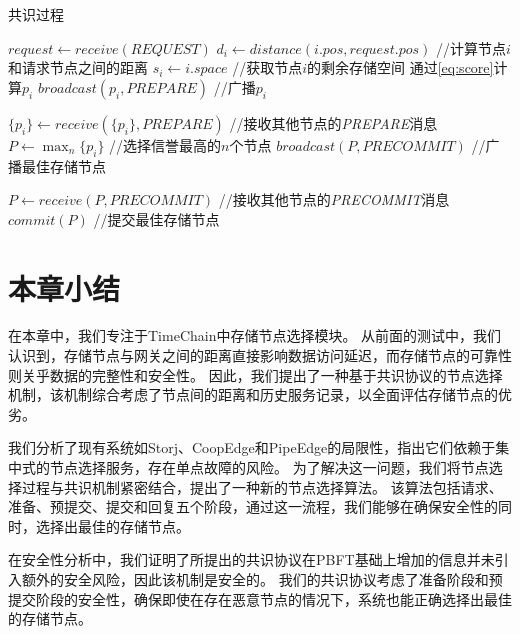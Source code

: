 \begin{algorithm}
	\caption{共识过程}
	\label{algo:consensus}
	\begin{algorithmic}[1]
        \renewcommand{\algorithmicrequire}{ \textbf{准备阶段}}
        \REQUIRE
            \STATE $request \gets \textit{receive}(REQUEST)$
                \STATE $d_i \gets \textit{distance}(i.pos, request.pos)$ //计算节点$i$和请求节点之间的距离
                \STATE $s_i \gets i.space$ //获取节点$i$的剩余存储空间
                \STATE 通过\autoref{eq:score}计算$p_i$
                \STATE $\textit{broadcast}(p_i, \textit{PREPARE})$  //广播$p_i$
            \ENDIF

        \renewcommand{\algorithmicrequire}{ \textbf{预提交阶段}}
        \REQUIRE
            \STATE $\{p_i\} \gets \textit{receive}(\{p_i\}, \textit{PREPARE})$  //接收其他节点的\textit{PREPARE}消息
                \STATE $P \gets \max_n \{p_i\}$ //选择信誉最高的$n$个节点
                \STATE $\textit{broadcast}(P, \textit{PRECOMMIT})$  //广播最佳存储节点
            \ENDIF

        \renewcommand{\algorithmicrequire}{ \textbf{提交阶段}}
        \REQUIRE
            \STATE $P \gets \textit{receive}(P, \textit{PRECOMMIT})$    //接收其他节点的\textit{PRECOMMIT}消息
                \STATE $\textit{commit}(P)$ //提交最佳存储节点
            \ENDIF
	\end{algorithmic}
\end{algorithm}

\section{本章小结}
在本章中，我们专注于TimeChain中存储节点选择模块。
从前面的测试中，我们认识到，存储节点与网关之间的距离直接影响数据访问延迟，而存储节点的可靠性则关乎数据的完整性和安全性。
因此，我们提出了一种基于共识协议的节点选择机制，该机制综合考虑了节点间的距离和历史服务记录，以全面评估存储节点的优劣。

我们分析了现有系统如Storj、CoopEdge和PipeEdge的局限性，指出它们依赖于集中式的节点选择服务，存在单点故障的风险。
为了解决这一问题，我们将节点选择过程与共识机制紧密结合，提出了一种新的节点选择算法。
该算法包括请求、准备、预提交、提交和回复五个阶段，通过这一流程，我们能够在确保安全性的同时，选择出最佳的存储节点。

在安全性分析中，我们证明了所提出的共识协议在PBFT基础上增加的信息并未引入额外的安全风险，因此该机制是安全的。
我们的共识协议考虑了准备阶段和预提交阶段的安全性，确保即使在存在恶意节点的情况下，系统也能正确选择出最佳的存储节点。


